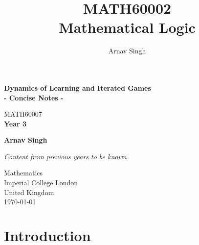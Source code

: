 \documentclass[a4paper]{article}
\author{Arnav Singh}
\title{MATH60002\\Mathematical Logic}
\begin{document}
\begin{titlepage}
    \begin{center}
        \vspace*{1cm}
         
         \huge
        \textbf{Dynamics of Learning and Iterated Games\\ - Concise Notes -}
 
        \vspace{0.5cm}
         MATH60007\\
         \vspace{0.25cm}
         \large
         \textbf{Year 3}
             
        \vspace{1.5cm}
         
         \LARGE
        \textbf{Arnav Singh}
        
        \vspace{1.2cm}
 
             
        
             
        \vspace{1.8cm}
        
         \normalsize
        \vspace{0.2cm}
        
         \textit{Content from previous years to be known.}
         
         \vfill
             
        Mathematics\\
        Imperial College London\\
        United Kingdom\\
        \today
             
    \end{center}
 \end{titlepage}

 \tableofcontents

\pagebreak

\setcounter{section}{-1}
\section{Introduction}
\end{document}

